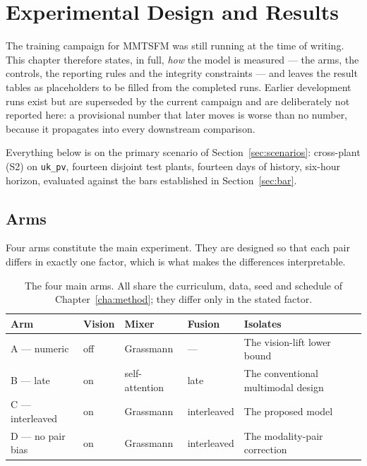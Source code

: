 \chapter{Experimental Design and Results}
\label{cha:expdesign}

The training campaign for MMTSFM was still running at the time of writing. This chapter
therefore states, in full, \emph{how} the model is measured --- the arms, the controls, the
reporting rules and the integrity constraints --- and leaves the result tables as
placeholders to be filled from the completed runs. Earlier development runs exist but are
superseded by the current campaign and are deliberately not reported here: a provisional
number that later moves is worse than no number, because it propagates into every
downstream comparison.

Everything below is on the primary scenario of Section~\ref{sec:scenarios}: cross-plant
(S2) on \texttt{uk\_pv}, fourteen disjoint test plants, fourteen days of history, six-hour
horizon, evaluated against the bars established in Section~\ref{sec:bar}.

\section{Arms}
\label{sec:arms}

Four arms constitute the main experiment. They are designed so that each pair differs in
exactly one factor, which is what makes the differences interpretable.

\begin{table}[h!]
\centering
\small
\begin{tabular}{l l l l p{4.4cm}}
\hline
\textbf{Arm} & \textbf{Vision} & \textbf{Mixer} & \textbf{Fusion} & \textbf{Isolates} \\
\hline
A --- numeric & off & Grassmann & --- & The vision-lift lower bound \\
B --- late & on & self-attention & late & The conventional multimodal design \\
C --- interleaved & on & Grassmann & interleaved & The proposed model \\
D --- no pair bias & on & Grassmann & interleaved & The modality-pair correction \\
\hline
\end{tabular}
\caption{The four main arms. All share the curriculum, data, seed and schedule of
Chapter~\ref{cha:method}; they differ only in the stated factor.}
\label{tab:arms}
\end{table}

